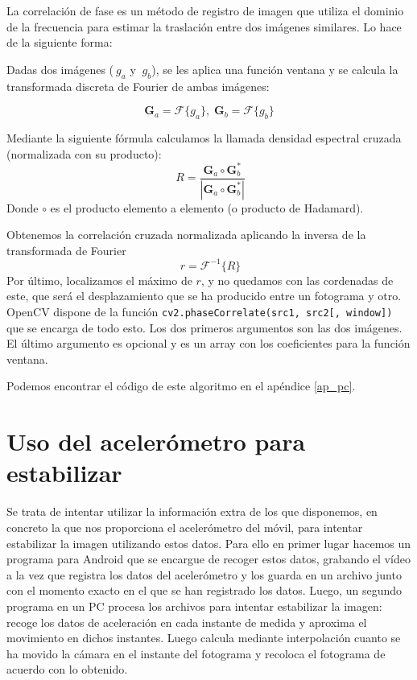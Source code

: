 \documentclass[a4paper,openright, 12pt]{book}
\begin{document}
La correlación de fase es un método de registro de imagen que utiliza el dominio de la frecuencia para estimar la traslación entre dos imágenes similares. Lo hace de la siguiente forma:


Dadas dos imágenes ($\ g_a$ y $\ g_b$), se les aplica una función ventana y se calcula la transformada discreta de Fourier de ambas imágenes:
  
\begin{equation*} 
    \mathbf{G}_a = \mathcal{F}\{g_a\}, \; \mathbf{G}_b = \mathcal{F}\{g_b\}
\end{equation*}

Mediante la siguiente fórmula calculamos la llamada densidad espectral cruzada (normalizada con su producto):
\begin{equation*}
   \ R = \frac{ \mathbf{G}_a \circ \mathbf{G}_b^*}{|\mathbf{G}_a \circ \mathbf{G}_b^*|}
\end{equation*}
Donde $\circ$ es el producto elemento a elemento (o producto de Hadamard).

Obtenemos la correlación cruzada normalizada aplicando la inversa de la transformada de Fourier
\begin{equation*}
    \ r = \mathcal{F}^{-1}\{R\}
\end{equation*}
Por último, localizamos el máximo de $r$, y no quedamos con las cordenadas de este, que será el desplazamiento que se ha producido entre un fotograma y otro.
OpenCV dispone de la función \lstinline|cv2.phaseCorrelate(src1, src2[, window])| que se encarga de todo esto. Los dos primeros argumentos son las dos imágenes. El último argumento es opcional y es un array con los coeficientes para la función ventana.

Podemos encontrar el código de este algoritmo en el apéndice \ref{ap_pc}.
\newpage
\section{Uso del acelerómetro para estabilizar}
Se trata de intentar utilizar la información extra de los que disponemos, en concreto la que nos proporciona el acelerómetro del móvil, para intentar estabilizar la imagen utilizando estos datos.
Para ello en primer lugar hacemos un programa para Android que se encargue de recoger estos datos, grabando el vídeo a la vez que registra los datos del acelerómetro y los guarda en un archivo junto con el momento exacto en el que se han registrado los datos.
Luego, un segundo programa en un PC procesa los archivos para intentar estabilizar la imagen: recoge los datos de aceleración en cada instante de medida y aproxima el movimiento en dichos instantes. Luego calcula mediante interpolación cuanto se ha movido la cámara en el instante del fotograma y recoloca el fotograma de acuerdo con lo obtenido.
\end{document}
